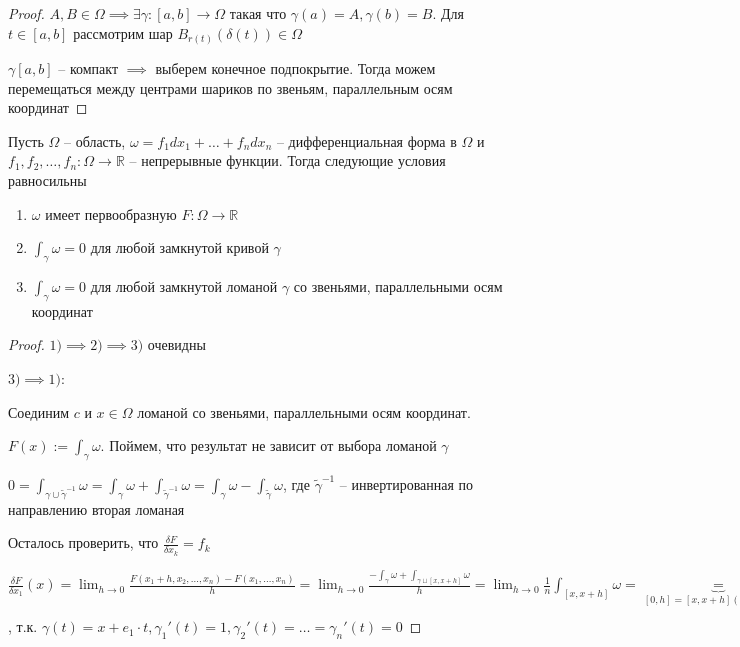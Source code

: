 \begin{proof}
    $A, B \in \Omega \implies \exists \gamma: [a, b] \to \Omega$ такая что $\gamma(a) = A, \gamma(b) = B$. Для $t \in [a, b]$ рассмотрим шар $B_{r(t)}(\delta(t)) \in \Omega$
    

    $\gamma[a, b]$ -- компакт $\implies$ выберем конечное подпокрытие. Тогда можем перемещаться между центрами шариков по звеньям, параллельным осям координат

\end{proof}

\begin{theorem}
    Пусть $\Omega$ -- область, $\omega = f_1dx_1 + \dots + f_ndx_n$ -- дифференциальная форма в $\Omega$ и $f_1, f_2, \dots, f_n: \Omega \to \mathbb{R}$ -- непрерывные функции. Тогда следующие условия равносильны

    \begin{enumerate}
        \item $\omega$ имеет первообразную $F: \Omega \to \mathbb{R}$
        \item $\int_{\gamma}^{}\omega = 0$ для любой замкнутой кривой $\gamma$
        \item $\int_{\gamma}^{}\omega = 0$ для любой замкнутой ломаной $\gamma$ со звеньями, параллельными осям координат
    \end{enumerate}
\end{theorem}

\begin{proof}
    $1) \implies 2) \implies 3)$ очевидны

    $3) \implies 1)$: 

    Соединим $c$ и $x \in \Omega$ ломаной со звеньями, параллельными осям координат. 
    
    $F(x) := \int_{\gamma}^{}\omega$. Поймем, что результат не зависит от выбора ломаной $\gamma$

    $0 = \int_{\gamma \cup \tilde{\gamma}^{-1}}^{}\omega = \int_{\gamma}^{}\omega + \int_{\tilde{\gamma}^{-1}}^{}\omega = \int_{\gamma}^{}\omega - \int_{\tilde{\gamma}}^{}\omega$, где $\tilde{\gamma}^{-1}$ -- инвертированная по направлению вторая ломаная

    Осталось проверить, что $\frac{\delta F}{\delta x_k} = f_k$

    $\frac{\delta F}{\delta x_1}(x) = \lim_{h \to 0} \frac{F(x_1 + h, x_2, \dots, x_n) - F(x_1, \dots, x_n)}{h} = \lim_{h \to 0} \frac{-\int_{\gamma}^{}\omega + \int_{\gamma \sqcup [x, x + h]}^{}\omega}{h} = \lim_{h \to 0} \frac{1}{n}\int_{[x, x + h]}^{}\omega = \underbrace{=}_{[0, h] = [x, x + h] (\text{сдвиг на x})} \lim_{h \to 0} \frac{1}{n}\int_{0}^{h}\underbrace{f_1(\gamma(t))}_{x + e_1t}\underbrace{\gamma_1'(t)}_{= 1}dt = \lim \frac{1}{n}\underbrace{\int_{0}^{1}f_1(x + e_1t)dt}_{= h \cdot f_1(x + e_1h\cdot\theta, \theta \in (0, 1))} = f_1(x)$, т.к. $\gamma(t) = x + e_1 \cdot t, \gamma_1'(t) = 1, \gamma_2'(t) = \dots = \gamma_n'(t) = 0$
\end{proof}


